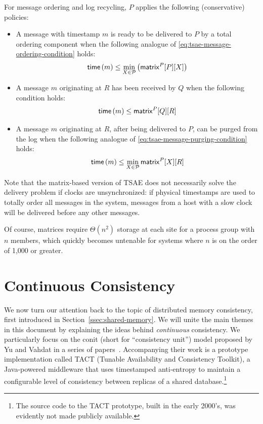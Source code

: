 \documentclass[]             %
{NASA}                       %
\theoremstyle{definition}
\begin{document}
For message ordering and log recycling, $P$ applies the following
(conservative) policies:
\begin{itemize}
\item A message with timestamp $m$ is ready to be delivered to $P$ by a total
  ordering component when the following analogue of \eqref{eq:tsae-message-ordering-condition} holds:
  \begin{equation}
    \mathsf{time}\left(m\right) \leq \min_{X \in \mathcal{P}} \left(\mathsf{matrix}^{P}[P][X]\right)
  \end{equation}
\item A message $m$ originating at $R$ has been
  received by $Q$ when the following condition holds:
  \begin{equation}
    \mathsf{time}\left(m\right) \leq \mathsf{matrix}^{P}[Q][R]
  \end{equation}
\item A message $m$ originating at $R$, after being delivered to $P$,
  can be purged from the log when the following analogue of
  \eqref{eq:tsae-message-purging-condition} holds:
  \begin{equation}
    \mathsf{time}\left(m\right) \leq \min_{X \in \mathcal{P}}\mathsf{matrix}^{P}[X][R]
  \end{equation}
\end{itemize}
Note that the matrix-based version of TSAE does not necessarily solve
the delivery problem if clocks are unsynchronized: if physical
timestamps are used to totally order all messages in the system,
messages from a host with a slow clock will be delivered before any
other messages.

Of course, matrices require $\Theta(n^2)$ storage at each site for a
process group with $n$ members, which quickly becomes untenable for
systems where $n$ is on the order of 1,000 or greater.

\section{Continuous Consistency}
\label{sec:continuous-consistency}
We now turn our attention back to the topic of distributed memory
consistency, first introduced in Section~\ref{ssec:shared-memory}. We
will unite the main themes in this document by explaining the ideas
behind \emph{continuous} consistency. We particularly focus on the
conit (short for ``consistency unit'') model proposed by Yu and Vahdat
in a series of papers~\cite{2000tact,2000tactalgorithms,10.5555/1251229.1251250,DBLP:conf/icdcs/YuV01,2002tact}.
Accompanying their work is a prototype implementation called TACT
(Tunable Availability and Consistency Toolkit), a Java-powered
middleware that uses timestamped anti-entropy to maintain a
configurable level of consistency between replicas of a shared
database.\footnote{The source code to the TACT prototype, built in the
  early 2000's, was evidently not made publicly available.}
\end{document}
